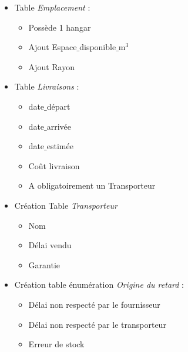\begin{itemize}[label=\textbullet, font=\LARGE \color{listGreen}]
\item Table \textit{Emplacement} : 

	\begin{itemize}[label=\textbullet, font=\LARGE \color{listGrey}]
		\item Possède 1 hangar 

		\item Ajout Espace$\_$disponible$\_$m$^3$ 

		\item Ajout Rayon
	\end{itemize}
 

\item Table \textit{Livraisons} :  

	\begin{itemize}[label=\textbullet, font=\LARGE \color{listGrey}]
		\item date$\_$départ 

		\item date$\_$arrivée 

       \item date$\_$estimée 
	
		\item Coût livraison 

		\item A obligatoirement un Transporteur 
	\end{itemize}


\item Création Table \textit{Transporteur} 

	\begin{itemize}[label=\textbullet, font=\LARGE \color{listGrey}]
		\item Nom 

		\item Délai vendu 
	
		\item Garantie
	\end{itemize}
 

\item Création table énumération \textit{Origine du retard} : 

	\begin{itemize}[label=\textbullet, font=\LARGE \color{listGrey}]
		\item Délai non respecté par le fournisseur 

		\item Délai non respecté par le transporteur 

		\item Erreur de stock 


\end{itemize}
\end{itemize}

